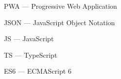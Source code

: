 
\hypertarget{pwa}{PWA --- Progressive Web Application}

\hypertarget{json}{JSON --- JavaScript Object Notation}

\hypertarget{js}{JS --- JavaScript}

\hypertarget{ts}{TS --- TypeScript}

\hypertarget{es6}{ES6 --- ECMAScript 6}

\clearpage